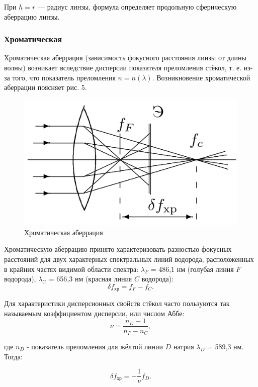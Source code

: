 \documentclass[a4paper,12pt]{article} %
\begin{document}
	При $h = r$ — радиус линзы, формула определяет продольную сферическую аберрацию линзы.
		
	
	\subsubsection*{Хроматическая}
	Хроматическая аберрация (зависимость фокусного расстояния линзы от длины волны) возникает вследствие дисперсии показателя преломления стёкол, т. е. из-за того, что показатель преломления $n = n(\lambda)$. Возникновение хроматической аберрации поясняет рис. 5.
	
	\begin{figure}[h!]
		\centering
		\includegraphics[scale=0.6]{Pictures/Хром}
		\caption{Хроматическая аберрация}
	\end{figure}

	Хроматическую аберрацию принято характеризовать разностью фокусных расстояний для двух характерных спектральных
линий водорода, расположенных в крайних частях видимой области спектра: $\lambda_F$ = 486,1 нм (голубая линия $F$ водорода), $\lambda_C$ = 656,3 нм (красная линия $C$ водорода):
	\begin{equation*}
		\delta f_{\text{хр}} = f_F - f_C.
	\end{equation*}	

	Для характеристики дисперсионных свойств стёкол часто пользуются так называемым коэффициентом дисперсии, или числом Аббе:
	\begin{equation*}
		\nu = \frac{n_D - 1}{n_F - n_C},
	\end{equation*}

	где $n_D$ - показатель преломления для жёлтой линии $D$ натрия $\lambda_D$ = 589,3 нм.
	Тогда:
	
	\begin{equation*}
		\delta f_{\text{хр}} = -\frac{1}{\nu} f_D.
	\end{equation*}
\end{document}
